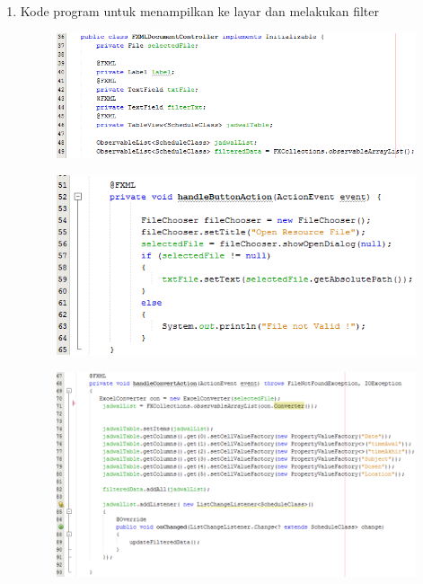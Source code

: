\begin{enumerate}
\begin{figure}[H]
		\end{figure}
	\item Kode program untuk menampilkan ke layar dan melakukan filter
		\begin{figure}[H]
		\includegraphics[scale=0.8]{Gambar/controller}
		\end{figure}
		\begin{figure}[H]
		\includegraphics[scale=0.8]{Gambar/controller1}
		\end{figure}
		\begin{figure}[H]
		\includegraphics[scale=0.8]{Gambar/controller2}
		\end{figure}
		\begin{figure}[H]

\end{figure}
\end{enumerate}
